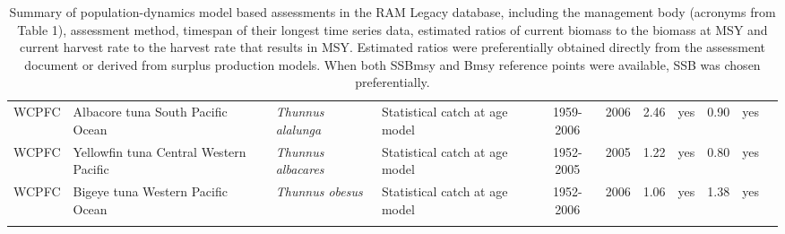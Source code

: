 \begin{longtable}{p{1.8cm}p{3.5cm}p{3.5cm}p{3cm}cccp{0.9cm}cp{0.9cm}c}
  WCPFC & Albacore tuna South Pacific Ocean & \textit{Thunnus alalunga} & Statistical catch at age model & 1959-2006 & 2006 & 2.46 & yes & 0.90 & yes & \cite{JENSEN_ALBWPO_2008.pdf} \\ 
  WCPFC & Yellowfin tuna Central Western Pacific & \textit{Thunnus albacares} & Statistical catch at age model & 1952-2005 & 2005 & 1.22 & yes & 0.80 & yes & \cite{WCPFC-SC3-SA-SWG-WP-01.pdf} \\ 
  WCPFC & Bigeye tuna Western Pacific Ocean & \textit{Thunnus obesus} & Statistical catch at age model & 1952-2006 & 2006 & 1.06 & yes & 1.38 & yes & \cite{SC4-SA-WP1-rev1-bigeye-tuna.pdf} \\ 
   \hline
\hline
\caption{Summary of population-dynamics model based assessments in the RAM Legacy database, including the management body (acronyms from Table 1), assessment method, timespan of their longest time series data, estimated ratios of current biomass to the biomass at MSY and current harvest rate to the harvest rate that results in MSY. Estimated ratios were preferentially obtained directly from the assessment document or derived from surplus production models. When both SSBmsy and Bmsy reference points were available, SSB was chosen preferentially.}
\label{tab:crosshair}
\end{longtable}
